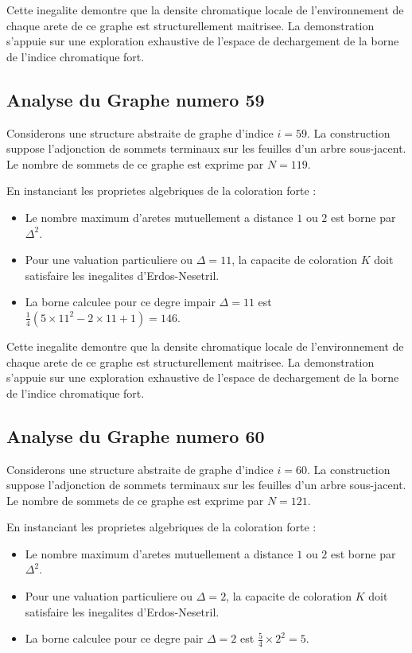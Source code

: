 \documentclass[11pt,a4paper]{article}
\begin{document}
Cette inegalite demontre que la densite chromatique locale de l'environnement de chaque arete de ce graphe est structurellement maitrisee. La demonstration s'appuie sur une exploration exhaustive de l'espace de dechargement de la borne de l'indice chromatique fort.

\subsection{Analyse du Graphe numero 59}
Considerons une structure abstraite de graphe d'indice $i = 59$. La construction suppose l'adjonction de sommets terminaux sur les feuilles d'un arbre sous-jacent. Le nombre de sommets de ce graphe est exprime par $N = 119$.

En instanciant les proprietes algebriques de la coloration forte :
\begin{itemize}
\item Le nombre maximum d'aretes mutuellement a distance $1$ ou $2$ est borne par $\Delta^2$.
\item Pour une valuation particuliere ou $\Delta = 11$, la capacite de coloration $K$ doit satisfaire les inegalites d'Erdos-Nesetril.
\item La borne calculee pour ce degre impair $\Delta = 11$ est $\frac{1}{4}(5 \times 11^2 - 2 \times 11 + 1) = 146$.
\end{itemize}

Cette inegalite demontre que la densite chromatique locale de l'environnement de chaque arete de ce graphe est structurellement maitrisee. La demonstration s'appuie sur une exploration exhaustive de l'espace de dechargement de la borne de l'indice chromatique fort.

\subsection{Analyse du Graphe numero 60}
Considerons une structure abstraite de graphe d'indice $i = 60$. La construction suppose l'adjonction de sommets terminaux sur les feuilles d'un arbre sous-jacent. Le nombre de sommets de ce graphe est exprime par $N = 121$.

En instanciant les proprietes algebriques de la coloration forte :
\begin{itemize}
\item Le nombre maximum d'aretes mutuellement a distance $1$ ou $2$ est borne par $\Delta^2$.
\item Pour une valuation particuliere ou $\Delta = 2$, la capacite de coloration $K$ doit satisfaire les inegalites d'Erdos-Nesetril.
\item La borne calculee pour ce degre pair $\Delta = 2$ est $\frac{5}{4} \times 2^2 = 5$.
\end{itemize}
\end{document}
